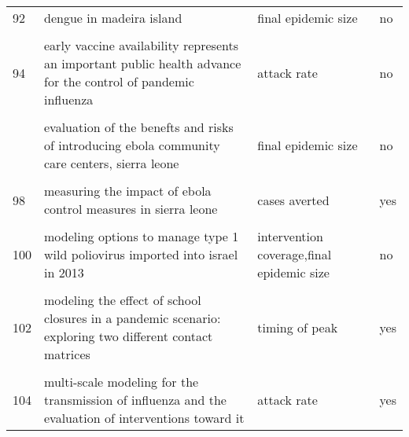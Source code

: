 \documentclass[
]{article}
\begin{document}
\begin{landscape}
\begin{longtable}{l>{\raggedright\arraybackslash}p{4cm}>{\raggedright\arraybackslash}p{6cm}l}
92 & dengue in madeira island & final epidemic size & no\\
\cellcolor{gray!6}{93} & \cellcolor{gray!6}{dynamic simulation of a seiqr-v epidemic model based on cellular automata} & \cellcolor{gray!6}{cases averted,final epidemic size} & \cellcolor{gray!6}{no}\\
94 & early vaccine availability represents an important public health advance for the control of pandemic influenza & attack rate & no\\
\cellcolor{gray!6}{95} & \cellcolor{gray!6}{effectiveness of ebola treatment units and community care centers — liberia, september 23–october 31, 2014} & \cellcolor{gray!6}{cases averted,cumulative incidence} & \cellcolor{gray!6}{no}\\
\addlinespace
96 & evaluation of the benefts and risks of introducing ebola community care centers, sierra leone & final epidemic size & no\\
\cellcolor{gray!6}{97} & \cellcolor{gray!6}{evidence for emergency vaccination having played a crucial role to control the 1965/66 foot-and-mouth disease outbreak in switzerland} & \cellcolor{gray!6}{outbreak duration and timing,number of animals culled,number of premises culled} & \cellcolor{gray!6}{yes}\\
98 & measuring the impact of ebola control measures in sierra leone & cases averted & yes\\
\cellcolor{gray!6}{99} & \cellcolor{gray!6}{media impact switching surface during an infectious disease outbreak} & \cellcolor{gray!6}{timing of peak,hospital notifications} & \cellcolor{gray!6}{yes}\\
100 & modeling options to manage type 1 wild poliovirus imported into israel in 2013 & intervention coverage,final epidemic size & no\\
\addlinespace
\cellcolor{gray!6}{101} & \cellcolor{gray!6}{modeling the effect of comprehensive interventions on ebola virus transmission} & \cellcolor{gray!6}{final epidemic size,basic reproduction number} & \cellcolor{gray!6}{yes}\\
102 & modeling the effect of school closures in a pandemic scenario: exploring two different contact matrices & timing of peak & yes\\
\cellcolor{gray!6}{103} & \cellcolor{gray!6}{modelling the effect of early detection of ebola} & \cellcolor{gray!6}{attack rate} & \cellcolor{gray!6}{no}\\
104 & multi-scale modeling for the transmission of influenza and the evaluation of interventions toward it & attack rate & yes\\

\end{longtable}
\end{landscape}
\end{document}
